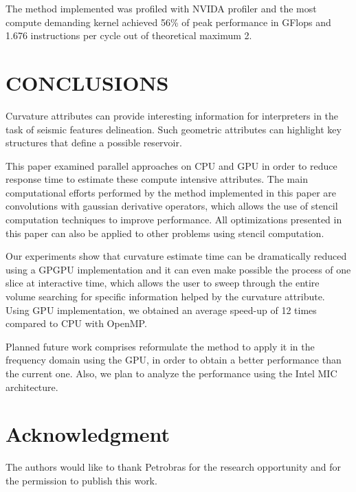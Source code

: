 \documentclass[conference]{IEEEtran}
\begin{document}
The method implemented was profiled with NVIDA profiler and the most compute demanding kernel achieved 56\% of peak performance in GFlops and 1.676 instructions per cycle out of theoretical maximum 2. 


\section{CONCLUSIONS} \label{sec:conclusions}

Curvature attributes can provide interesting information for interpreters in the task of seismic features delineation. Such geometric attributes can highlight key structures that define a possible reservoir.

This paper examined parallel approaches on CPU and GPU in order to reduce response time to estimate these compute intensive attributes. The main computational efforts performed by  the method implemented in this paper are convolutions with gaussian derivative operators, which allows the use of stencil computation techniques to improve performance. All optimizations presented in this paper can also be applied to other problems using stencil computation. 

Our experiments show that curvature estimate time can be dramatically reduced using a GPGPU implementation and it can even make possible the process of one slice at interactive time, which allows the user to sweep through the entire volume searching for specific information helped by the curvature attribute. Using GPU implementation, we obtained an average speed-up of 12 times compared to CPU with OpenMP.

Planned future work comprises reformulate the method to apply it in the frequency domain using the GPU, in order to obtain a better performance than the current one. Also, we plan to analyze the performance using the Intel MIC architecture.




\section*{Acknowledgment}


The authors would like to thank Petrobras for the research opportunity and for the permission to publish this work.





\end{document}
